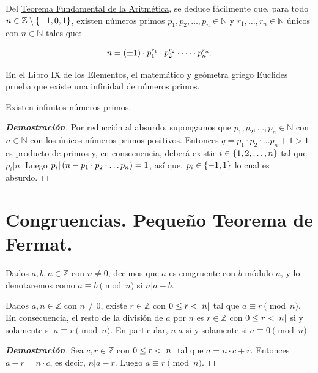 Del \hyperref[Teorema Fundamental de la Aritmética]{Teorema Fundamental de la Aritmética}, se deduce fácilmente que, para todo $n\in\mathbb{Z}\setminus\left\{-1,0,1\right\}$, existen números primos $p_1,p_2,\dots,p_n\in\mathbb{N}$ y $r_1,\dots,r_n\in\mathbb{N}$ únicos con $n\in\mathbb{N}$ tales que:

\begin{equation}
  n=\left(\pm 1\right)\cdot p_1^{r_1}\cdot p_2^{r_2}\cdot\cdots\cdot p_n^{r_n}.
\end{equation}

En el Libro IX de los Elementos, el matemático y geómetra griego Euclides prueba que existe una infinidad de números primos.

\begin{corollary}
  \rm Existen infinitos números primos.
  \begin{proof}[\rm\textbf{Demostración}]
    Por reducción al absurdo, supongamos que $p_1,p_2,\dots,p_n\in\mathbb{N}$ con $n\in\mathbb{N}$ con los únicos números primos positivos. Entonces $q=p_1\cdot p_2\cdot\dots p_n+1>1$ es producto de primos y, en consecuencia, deberá existir $i\in\left\{1,2,\dots,n\right\}$ tal que $p_i|n$. Luego $p_i|\left(n-p_1\cdot p_2\cdot\dots p_n\right)=1$, así que, $p_i\in\left\{-1,1\right\}$ lo cual es absurdo. 
  \end{proof}
\end{corollary}
\section{Congruencias. Pequeño Teorema de Fermat.}

\begin{definition}
  \rm Dados $a,b,n\in\mathbb{Z}$ con $n\neq 0$, decimos que $a$ es congruente con $b$ módulo $n$, y lo denotaremos como $a\equiv b\pmod{n}$ si $n|a-b$.
\end{definition}

\begin{theorem}
  \rm Dados $a,n\in\mathbb{Z}$ con $n\neq 0$, existe $r\in\mathbb{Z}$ con $0\leq r<\left|n\right|$ tal que $a\equiv r\pmod{n}$. En consecuencia, el resto de la división de $a$ por $n$ es $r\in\mathbb{Z}$ con $0\leq r<\left|n\right|$ si y solamente si $a\equiv r\pmod{n}$. En particular, $n|a$ si y solamente si $a\equiv 0\pmod{n}$.
  \begin{proof}[\rm\textbf{Demostración}]
    Sea $c,r\in\mathbb{Z}$ con $0\leq r<\left|n\right|$ tal que $a=n\cdot c+r$. Entonces $a-r=n\cdot c$, es decir, $n|a-r$. Luego $a\equiv r\pmod{n}$.
  \end{proof}
\end{theorem}

